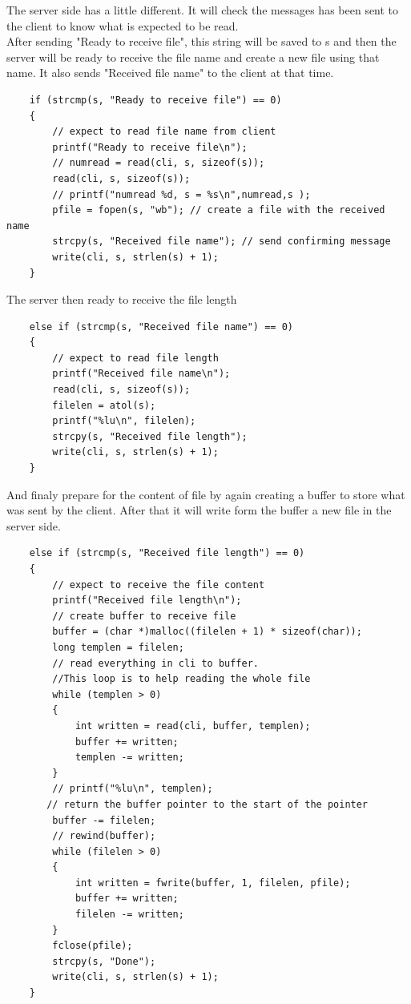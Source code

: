 \documentclass[12pt]{article}
\begin{document}
    The server side has a little different. It will check the messages has been sent to the client to know what is expected to be read.\\
    After sending "Ready to receive file", this string will be saved to s and then the server will be ready to receive the file name and create a new file using that name. It also sends "Received file name" to the client at that time.
    \begin{verbatim}
    if (strcmp(s, "Ready to receive file") == 0)
    {
        // expect to read file name from client 
        printf("Ready to receive file\n");
        // numread = read(cli, s, sizeof(s));
        read(cli, s, sizeof(s));
        // printf("numread %d, s = %s\n",numread,s );
        pfile = fopen(s, "wb"); // create a file with the received name 
        strcpy(s, "Received file name"); // send confirming message  
        write(cli, s, strlen(s) + 1);
    }
    \end{verbatim}
    The server then ready to receive the file length
    \begin{verbatim}
    else if (strcmp(s, "Received file name") == 0)
    {
        // expect to read file length 
        printf("Received file name\n");
        read(cli, s, sizeof(s));
        filelen = atol(s);
        printf("%lu\n", filelen);
        strcpy(s, "Received file length");
        write(cli, s, strlen(s) + 1);
    }
    \end{verbatim}
    And finaly prepare for the content of file by again creating a buffer to store what was sent by the client. After that it will write form the buffer a new file in the server side.
    \begin{verbatim}
    else if (strcmp(s, "Received file length") == 0)
    {
        // expect to receive the file content
        printf("Received file length\n");
        // create buffer to receive file
        buffer = (char *)malloc((filelen + 1) * sizeof(char));
        long templen = filelen;
        // read everything in cli to buffer. 
        //This loop is to help reading the whole file
        while (templen > 0)
        {
            int written = read(cli, buffer, templen);
            buffer += written;
            templen -= written;
        }
        // printf("%lu\n", templen);
       // return the buffer pointer to the start of the pointer
        buffer -= filelen; 
        // rewind(buffer);
        while (filelen > 0)
        {
            int written = fwrite(buffer, 1, filelen, pfile);
            buffer += written;
            filelen -= written;
        }
        fclose(pfile);
        strcpy(s, "Done");
        write(cli, s, strlen(s) + 1);
    }
    \end{verbatim}
\end{document}
